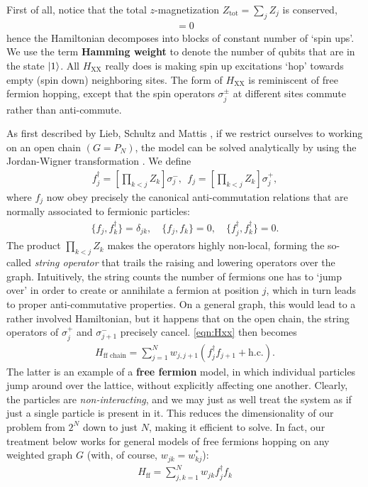 First of all, notice that the total $z$-magnetization $Z_\text{tot} = \sum_j Z_j$ is conserved,
\begin{align*}
[ H_\text{XX}, Z_\text{tot} ] = 0
\end{align*}
hence the Hamiltonian decomposes into blocks of constant number of `spin ups'. We use the term \textbf{Hamming weight} to denote the number of qubits that are in the state $\lvert1\rangle$. All $H_\text{XX}$ really does is making spin up excitations `hop' towards empty (spin down) neighboring sites. The form of $H_\text{XX}$ is reminiscent of free fermion hopping, except that the spin operators $\sigma_j^\pm$ at different sites commute rather than anti-commute. 

As first described by Lieb, Schultz and Mattis \cite{Lieb1961}, if we restrict ourselves to working on an open chain $(G = P_N)$, the model can be solved analytically by using the Jordan-Wigner transformation \cite{Jordan1928}. We define
\begin{align}
f^\dagger_j = [ \prod_{k < j} Z_{k} ] \sigma_j^-, \ \ f_j = [ \prod_{k < j} Z_{k} ] \sigma_j^+,
\end{align}
where $f_j$ now obey precisely the canonical anti-commutation relations that are normally associated to fermionic particles:
\begin{align}
\{ f_j, f^\dagger_k \} = \delta_{jk}, \quad 
\{ f_j, f_k \} = 0, \quad  \{ f^\dagger_j, f^\dagger_k \} = 0.
\end{align}
The product $\prod_{k < j} Z_{k}$ makes the operators highly non-local, forming the so-called \emph{string operator} that trails the raising and lowering operators over the graph. Intuitively, the string counts the number of fermions one has to `jump over' in order to create or annihilate a fermion at position $j$, which in turn leads to proper anti-commutative properties. On a general graph, this would lead to a rather involved Hamiltonian, but it happens that on the open chain, the string operators of $\sigma^+_j$ and $\sigma^-_{j+1}$ precisely cancel. \cref{eqn:Hxx} then becomes
\begin{align}
H_\text{ff chain} = \sum_{j=1}^{N} w_{j, j+1} \left( f^\dagger_j f_{j+1} + \text{h.c.} \right).
\label{eqn:ffchain}
\end{align}
The latter is an example of a \textbf{free fermion} model, in which individual particles jump around over the lattice, without explicitly affecting one another. Clearly, the particles are \emph{non-interacting}, and we may just as well treat the system as if just a single particle is present in it. This reduces the dimensionality of our problem from $2^N$ down to just $N$, making it efficient to solve. In fact, our treatment below works for general models of free fermions hopping on any weighted graph $G$ (with, of course, $w_{jk} = w_{kj}^*$):
\begin{align}
H_\text{ff} = \sum_{j,k=1}^N w_{jk}  f^\dagger_j f_{k}
\label{eqn:freefermion}
\end{align}


